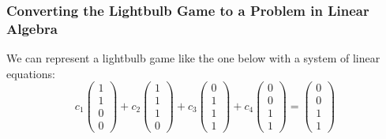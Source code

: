 \documentclass{beamer}
\newcommand{\on}{yellow}
\newcommand{\off}{white}
\begin{document}
\begin{frame}
\frametitle{Converting the Lightbulb Game to a Problem in Linear Algebra}
    We can represent a lightbulb game like the one below with a system of linear
    equations:
    \[
        c_1
        \begin{pmatrix}
            1\\1\\0\\0
        \end{pmatrix}
        + c_2
        \begin{pmatrix}
            1\\1\\1\\0
        \end{pmatrix}
        + c_3
        \begin{pmatrix}
            0\\1\\1\\1
        \end{pmatrix}
        + c_4
        \begin{pmatrix}
            0\\0\\1\\1
        \end{pmatrix}
        =
        \begin{pmatrix}
            0\\0\\1\\1
        \end{pmatrix}
    \]
\begin{figure}[!h]
    \centering
\end{figure}
\end{frame}
\end{document}
